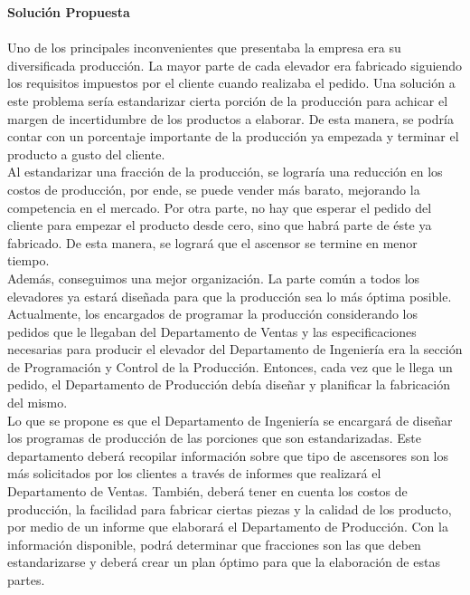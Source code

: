 \documentclass[a4paper,10pt,titlepage]{article}
\begin{document}
	\textbf{Soluci\'on Propuesta}\\\\
		\indent Uno de los principales inconvenientes que presentaba la empresa era su diversificada producci\'on. La  mayor parte de cada elevador era fabricado siguiendo los requisitos impuestos por el cliente cuando realizaba el pedido. Una soluci\'on a este problema ser\'ia estandarizar cierta porci\'on de la producci\'on para achicar el margen de incertidumbre de los productos a elaborar. De esta manera, se podr\'ia contar con un porcentaje importante de la producci\'on ya empezada y terminar el producto a gusto del cliente. \\
		\indent Al estandarizar una fracci\'on de la producci\'on, se lograr\'ia una reducci\'on en los costos de producci\'on, por ende, se puede vender m\'as barato, mejorando la competencia en el mercado. Por otra parte, no hay que esperar el pedido del cliente para empezar el producto desde cero, sino que habr\'a parte de \'este ya fabricado. De esta manera, se lograr\'a que el ascensor se termine en menor tiempo. \\
		\indent Adem\'as, conseguimos una mejor organizaci\'on. La parte com\'un a todos los elevadores ya estar\'a diseñada para que la producci\'on sea lo m\'as \'optima posible. \\
		\indent Actualmente, los encargados de programar la producci\'on considerando los pedidos que le llegaban del Departamento de Ventas y las especificaciones necesarias para producir el elevador del Departamento de Ingenier\'ia era la secci\'on de Programaci\'on y Control de la Producci\'on. Entonces, cada vez que le llega un pedido, el Departamento de Producci\'on deb\'ia diseñar y planificar la fabricaci\'on del mismo.\\
		\indent Lo que se propone es que el Departamento de Ingenier\'ia se encargar\'a de  diseñar los programas de producci\'on de las porciones que son estandarizadas. Este departamento deber\'a recopilar informaci\'on sobre que tipo de ascensores son los m\'as solicitados por los clientes a trav\'es de informes que realizar\'a el Departamento de Ventas. Tambi\'en, deber\'a tener en cuenta los costos de producci\'on, la facilidad para fabricar ciertas piezas y la calidad de los producto, por medio de un informe que elaborar\'a el Departamento de Producci\'on. Con la informaci\'on disponible, podr\'a determinar que fracciones son las que deben estandarizarse y deber\'a crear un plan \'optimo para que la elaboraci\'on de estas partes. \\
\end{document}
